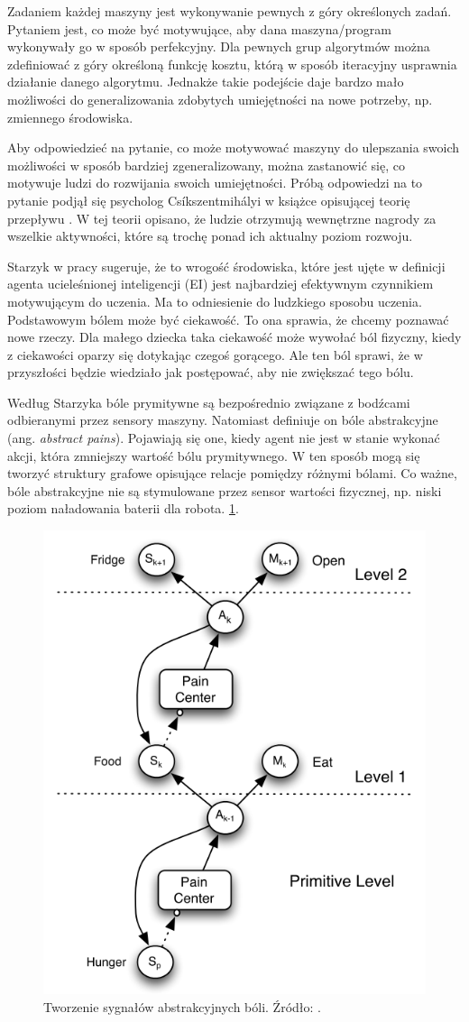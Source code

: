 Zadaniem każdej maszyny jest wykonywanie pewnych z góry określonych zadań. 
Pytaniem jest, co może być motywujące, aby dana maszyna/program wykonywały go w 
sposób perfekcyjny. Dla pewnych grup algorytmów można zdefiniować z góry 
określoną funkcję kosztu, którą w sposób iteracyjny usprawnia działanie danego 
algorytmu. Jednakże takie podejście daje bardzo mało możliwości do 
generalizowania zdobytych umiejętności na nowe potrzeby, np. zmiennego 
środowiska.

Aby odpowiedzieć na pytanie, co może motywować maszyny do ulepszania swoich 
możliwości w sposób bardziej zgeneralizowany, można zastanowić się, co motywuje 
ludzi do rozwijania swoich umiejętności. Próbą odpowiedzi na to pytanie podjął 
się psycholog Csíkszentmihályi w książce opisującej teorię przepływu 
\cite{csikszentmihalyi1996creativity}. W tej teorii opisano, że ludzie 
otrzymują wewnętrzne nagrody za wszelkie aktywności, które są trochę ponad ich 
aktualny poziom rozwoju. 

Starzyk w pracy \cite{motivation_in_ei} sugeruje, że to wrogość środowiska, 
które jest ujęte w definicji agenta ucieleśnionej inteligencji (EI) jest 
najbardziej efektywnym czynnikiem motywującym do uczenia. Ma to odniesienie do 
ludzkiego sposobu uczenia. Podstawowym bólem może być ciekawość. To ona 
sprawia, że chcemy poznawać nowe rzeczy. Dla małego dziecka taka ciekawość może 
wywołać ból fizyczny, kiedy z ciekawości oparzy się dotykając czegoś gorącego. 
Ale ten ból sprawi, że w przyszłości będzie wiedziało jak postępować, aby nie 
zwiększać tego bólu.

Według Starzyka bóle prymitywne są bezpośrednio związane z bodźcami odbieranymi 
przez sensory maszyny. Natomiast definiuje on bóle abstrakcyjne (ang. 
\textit{abstract pains}). Pojawiają się one, kiedy agent nie jest w stanie 
wykonać akcji, która zmniejszy wartość bólu prymitywnego. W ten sposób mogą się 
tworzyć struktury grafowe opisujące relacje pomiędzy różnymi bólami. Co ważne, 
bóle abstrakcyjne nie są stymulowane przez sensor wartości fizycznej, np. niski 
poziom naładowania baterii dla robota.  
\ref{fig:abstractpainscreation}.

\begin{figure}[H]
	\centering
	\includegraphics[width=0.5\linewidth]{rozdzial2/images/abstract_pains_creation}
	\caption{Tworzenie sygnałów abstrakcyjnych bóli. Źródło: 
	\cite{ml_dev_auto_systems}.}
	\label{fig:abstractpainscreation}
\end{figure}

